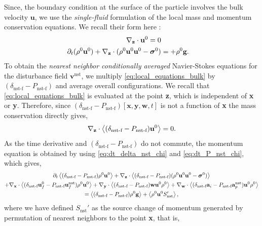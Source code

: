 Since, the boundary condition at the surface of the particle involves the bulk velocity $\textbf{u}$, we use the \textit{single-fluid} formulation of the local mass and momentum conservation equations. 
We recall their form here : 
\begin{align}
    \pddz \cdot \textbf{u}^0 = 0 \\
    \pddt (\rho^0\textbf{u}^0)
    + \pddz\cdot 
    (\rho^0\textbf{u}^0\textbf{u}^0 
    -\bm\sigma^0)
    &= 
    + \rho^0 \textbf{g}. 
    \label{eq:local_equations_bulk}
\end{align}
To obtain the \textit{nearest neighbor conditionally averaged} Navier-Stokes equations for the disturbance field  $\textbf{v}^\text{nst}$, we multiply \ref{eq:local_equations_bulk} by $(\delta_\text{nst-f} - P_\text{nst-f})$ and average overall configurations.
We recall that \ref{eq:local_equations_bulk} is evaluated at the point \textbf{z}, which is independent of \textbf{x} or \textbf{y}. 
Therefore, since $(\delta_\text{nst-f} - P_\text{nst-f})[\textbf{x},\textbf{y},\textbf{w},t]$ is not a function of \textbf{x} the mass conservation directly gives, 
\begin{equation}
    \pddz \cdot \avg{(\delta_\text{nst-f} - P_\text{nst-f}) \textbf{u}^0}
    = 0. 
    \label{eq:mass_nst_d}
\end{equation}
As the time derivative and $(\delta_\text{nst-f} - P_\text{nst-f})$ do not commute, the momentum equation is obtained by using \ref{eq:dt_delta_nst_chi} and \ref{eq:dt_P_nst_chi}, which gives, 
\begin{multline}
    \pddt \avg{(\delta_\text{nst-f} - P_\text{nst-f})\rho^0\textbf{u}^0}
    + \pddz\cdot \avg{ (\delta_\text{nst-f} - P_\text{nst-f}) ( \rho^0  \textbf{u}^0 \textbf{u}^0 - \bm\sigma^0)}\\
    +  \pddx \cdot \avg{(\delta_\text{nst-f} \textbf{u}_f^0 - P_\text{nst-f}\textbf{u}_f^\text{nst}) \rho^0 \textbf{u}^0}
    +  \pddy \cdot \avg{(\delta_\text{nst-f} - P_\text{nst-f}) \textbf{w} \textbf{u}^0 \rho^0}
    +  \pddw \cdot \avg{(\delta_\text{nst-f} \textbf{a}_i - P_\text{nst-f} \textbf{a}_p^\text{nst})\textbf{u}^0 \rho^0 }\\
    = 
     \avg{(\delta_\text{nst-f} - P_\text{nst-f})\rho^0 \textbf{g}} 
    + 
    \avg{\rho^0 \textbf{u}^0 S'_\text{nst} },
    \label{eq:momentum_nst_d}
\end{multline}
where we have defined $S_\text{nst}'$ as the source change of momentum generated by permutation of nearest neighbors to the point \textbf{x}, that is,
